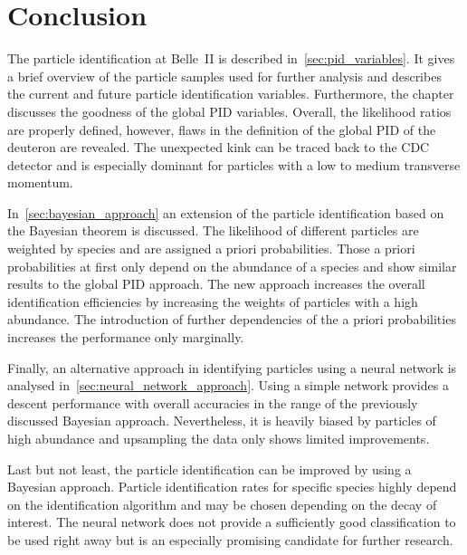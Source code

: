 \chapter{Conclusion}
\label{chap:conclusion}

The particle identification at Belle~\RN{2} is described in~\autoref{sec:pid_variables}. It gives a brief overview of the particle samples used for further analysis and describes the current and future particle identification variables. Furthermore, the chapter discusses the goodness of the global PID variables. Overall, the likelihood ratios are properly defined, however, flaws in the definition of the global PID of the deuteron are revealed. The unexpected kink can be traced back to the CDC detector and is especially dominant for particles with a low to medium transverse momentum.

In~\autoref{sec:bayesian_approach} an extension of the particle identification based on the Bayesian theorem is discussed. The likelihood of different particles are weighted by species and are assigned a priori probabilities. Those a priori probabilities at first only depend on the abundance of a species and show similar results to the global PID approach. The new approach increases the overall identification efficiencies by increasing the weights of particles with a high abundance. The introduction of further dependencies of the a priori probabilities increases the performance only marginally.

Finally, an alternative approach in identifying particles using a neural network is analysed in~\autoref{sec:neural_network_approach}. Using a simple network provides a descent performance with overall accuracies in the range of the previously discussed Bayesian approach. Nevertheless, it is heavily biased by particles of high abundance and upsampling the data only shows limited improvements.

Last but not least, the particle identification can be improved by using a Bayesian approach. Particle identification rates for specific species highly depend on the identification algorithm and may be chosen depending on the decay of interest. The neural network does not provide a sufficiently good classification to be used right away but is an especially promising candidate for further research.
